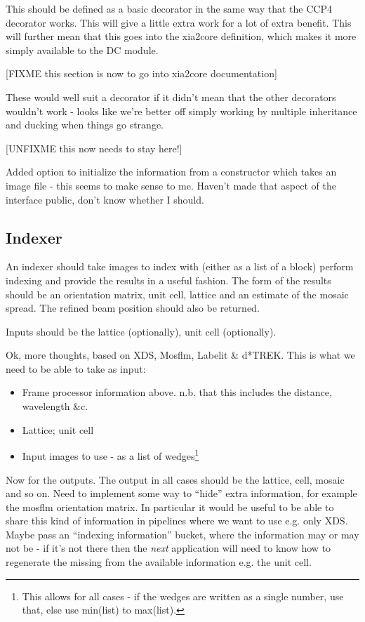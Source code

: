 \documentclass[a4paper, 11pt]{article}
\begin{document}
This should be defined as a basic decorator in the same way that the 
CCP4 decorator works. This will give a little extra work for a lot of 
extra benefit. This will further mean that this goes into the xia2core
definition, which makes it more simply available to the DC module.

[FIXME this section is now to go into xia2core documentation]

These would well suit a decorator if it didn't mean that the other
decorators wouldn't work - looks like we're better off simply working by
multiple inheritance and ducking when things go strange.

[UNFIXME this now needs to stay here!]

Added option to initialize the information from a constructor which takes
an image file - this seems to make sense to me. Haven't made that aspect
of the interface public, don't know whether I should.


\subsection{Indexer}

An indexer should take images to index with (either as a list of a block)
perform indexing and provide the results in a useful fashion. The form
of the results should be an orientation matrix, unit cell, lattice and 
an estimate of the mosaic spread. The refined beam position should also
be returned.

Inputs should be the lattice (optionally), unit cell (optionally).

Ok, more thoughts, based on XDS, Mosflm, Labelit \& d*TREK. This is what we
need to be able to take as input:

\begin{itemize}
\item{Frame processor information above. n.b. that this includes the distance,
wavelength \&c.}
\item{Lattice; unit cell}
\item{Input images to use - as a list of wedges\footnote{This allows for
all cases - if the wedges are written as a single number, use that, else
use min(list) to max(list).}}
\end{itemize}

Now for the outputs. The output in all cases should be the lattice, cell, 
mosaic and so on. Need to implement some way to ``hide'' extra information,
for example the mosflm orientation matrix. In particular it would be useful
to be able to share this kind of information in pipelines where we want to 
use e.g. only XDS. Maybe pass an ``indexing information'' bucket, where the
information may or may not be - if it's not there then the \emph{next}
application will need to know how to regenerate the missing from the available
information e.g. the unit cell.
\end{document}
